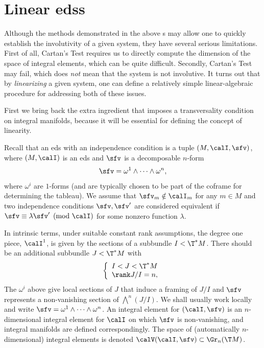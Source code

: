 \section{Linear \texorpdfstring{\glspl{eds}}{EDSs}}\label{sec: linear eds}


Although the methods demonstrated in the above \sect s may allow one to quickly establish the involutivity of a given system, they have several serious limitations. First of all, Cartan's Test requires us to directly compute the dimension of the space of integral elements, which can be quite difficult. Secondly, Cartan's Test may fail, which does \emph{not} mean that the system is not involutive. It turns out that by \emph{linearizing} a given system, one can define a relatively simple linear-algebraic procedure for addressing both of these issues.

First we bring back the extra ingredient that imposes a transversality condition on integral manifolds, because it will be essential for defining the concept of linearity.

\begin{defn}
    Recall that an \gls{eds} with an independence condition is a tuple $(M,\calI,\sfv)$, where $(M,\calI)$ is an \gls{eds} and $\sfv$ is a decomposable $n$-form 
    \[\sfv=\omega^1\wedge\cdots\wedge\omega^n,\]
    where $\omega^i$ are $1$-forms (and are typically chosen to be part of the coframe for determining the tableau). We assume that $\sfv_m\notin \calI_m$ for any $m\in M$ and two independence conditions $\sfv,\sfv'$ are considered equivalent if $\sfv\equiv \lambda\sfv'\pmod{\calI}$ for some nonzero function $\lambda$.

    In intrinsic terms, under suitable constant rank assumptions, the degree one piece, $\calI^1$, is given by the sections of a subbundle $I<\T^\ast M$. There should be an additional subbundle $J<\T^\ast M$ with 
    \[\left\{\begin{array}{l}
        I<J<\T^\ast M\\\rank J\slash I=n,
    \end{array}\right.\]
    The $\omega^i$ above give local sections of $J$ that induce a framing of $J\slash I$ and $\sfv$ represents a non-vanishing section of $\bigwedge^n(J\slash I)$. We shall usually work locally and write $\sfv=\omega^1\wedge\cdots\wedge\omega^n$. An integral element for $(\calI,\sfv)$ is an $n$-dimensional integral element for $\calI$ on which $\sfv$ is non-vanishing, and integral manifolds are defined correspondingly. The space of (automatically $n$-dimensional) integral elements is denoted $\calV(\calI,\sfv)\subset\Gr_n(\T M)$. 
\end{defn}

